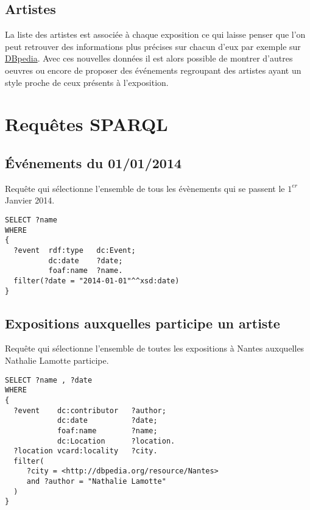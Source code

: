\documentclass[12pt,a4paper]{article}
\begin{document}
	\subsection{Artistes}
	La liste des artistes est associée à chaque exposition ce qui laisse penser que l'on peut retrouver des informations plus précises sur chacun d'eux par exemple sur \href{http://dbpedia.org}{DBpedia}. Avec ces nouvelles données il est alors possible de montrer d'autres oeuvres ou encore de proposer des événements regroupant des artistes ayant un style proche de ceux présents à l'exposition.
    
    \section{Requêtes SPARQL}
    
    \subsection{Événements du 01/01/2014}
    Requête qui sélectionne l'ensemble de tous les évènements qui se passent le $1^{er}$ Janvier 2014.
    

	\begin{lstlisting}[frame=single]
SELECT ?name
WHERE
{
  ?event  rdf:type   dc:Event;
          dc:date    ?date;
          foaf:name  ?name.
  filter(?date = "2014-01-01"^^xsd:date)
}
    \end{lstlisting}
	
    \subsection{Expositions auxquelles participe un artiste}
    Requête qui sélectionne l'ensemble de toutes les expositions à Nantes auxquelles Nathalie Lamotte participe.
    

	\begin{lstlisting}[frame=single]
SELECT ?name , ?date
WHERE
{
  ?event    dc:contributor   ?author;
            dc:date          ?date;
            foaf:name        ?name;
            dc:Location      ?location.
  ?location vcard:locality   ?city.
  filter(
     ?city = <http://dbpedia.org/resource/Nantes> 
     and ?author = "Nathalie Lamotte"
  )
}    
    \end{lstlisting}
    
\end{document}
